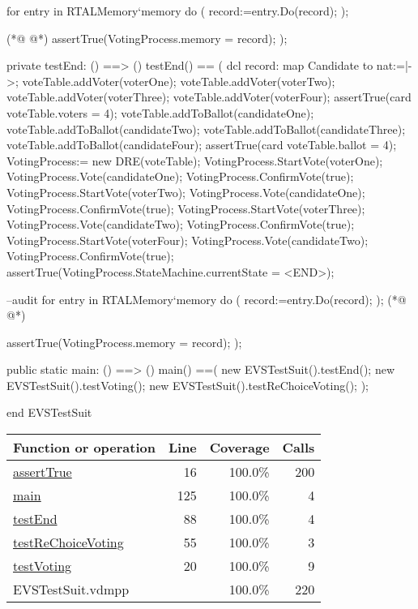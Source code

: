 \begin{vdmpp}
 for entry in RTALMemory`memory 
  do (
    record:=entry.Do(record);
  );
   
(*@
\label{testEnd:88}
@*)
  assertTrue(VotingProcess.memory = record);
);

private testEnd: () ==> ()
testEnd() ==
( 
 dcl record: map Candidate to nat:={|->};
 voteTable.addVoter(voterOne);
 voteTable.addVoter(voterTwo);
 voteTable.addVoter(voterThree);
 voteTable.addVoter(voterFour);
 assertTrue(card voteTable.voters = 4);
 voteTable.addToBallot(candidateOne);
 voteTable.addToBallot(candidateTwo);
 voteTable.addToBallot(candidateThree);
 voteTable.addToBallot(candidateFour);
 assertTrue(card voteTable.ballot = 4);
 VotingProcess:= new DRE(voteTable);
 VotingProcess.StartVote(voterOne);
 VotingProcess.Vote(candidateOne);
 VotingProcess.ConfirmVote(true);
 VotingProcess.StartVote(voterTwo);
 VotingProcess.Vote(candidateOne);
 VotingProcess.ConfirmVote(true);
 VotingProcess.StartVote(voterThree);
 VotingProcess.Vote(candidateTwo);
 VotingProcess.ConfirmVote(true);
 VotingProcess.StartVote(voterFour);
 VotingProcess.Vote(candidateTwo);
 VotingProcess.ConfirmVote(true);
 assertTrue(VotingProcess.StateMachine.currentState = <END>);
 
 --audit
 for entry in RTALMemory`memory 
  do (
    record:=entry.Do(record);
  );
(*@
\label{main:125}
@*)
   
  assertTrue(VotingProcess.memory = record);
);

public static main: () ==> ()
main() ==(
 new EVSTestSuit().testEnd();
 new EVSTestSuit().testVoting();
 new EVSTestSuit().testReChoiceVoting();
);

end EVSTestSuit
\end{vdmpp}
\bigskip
\begin{longtable}{|l|r|r|r|}
\hline
Function or operation & Line & Coverage & Calls \\
\hline
\hline
\hyperref[assertTrue:16]{assertTrue} & 16&100.0\% & 200 \\
\hline
\hyperref[main:125]{main} & 125&100.0\% & 4 \\
\hline
\hyperref[testEnd:88]{testEnd} & 88&100.0\% & 4 \\
\hline
\hyperref[testReChoiceVoting:55]{testReChoiceVoting} & 55&100.0\% & 3 \\
\hline
\hyperref[testVoting:20]{testVoting} & 20&100.0\% & 9 \\
\hline
\hline
EVSTestSuit.vdmpp & & 100.0\% & 220 \\
\hline
\end{longtable}

